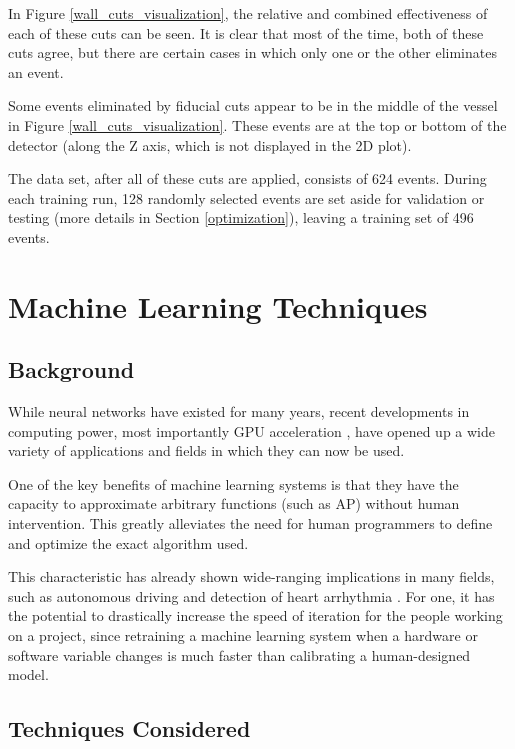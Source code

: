 \documentclass[10pt]{article}
\begin{document}
In Figure \ref{wall_cuts_visualization}, the relative and combined effectiveness of each of these cuts can be seen. It is clear that most of the time, both of these cuts agree, but there are certain cases in which only one or the other eliminates an event.

Some events eliminated by fiducial cuts appear to be in the middle of the vessel in Figure \ref{wall_cuts_visualization}. These events are at the top or bottom of the detector (along the Z axis, which is not displayed in the 2D plot).

The data set, after all of these cuts are applied, consists of 624 events. During each training run, 128 randomly selected events are set aside for validation or testing (more details in Section \ref{optimization}), leaving a training set of 496 events.

\section{Machine Learning Techniques} \label{ml_techniques}

\subsection{Background}

While neural networks have existed for many years, recent developments in computing power, most importantly GPU acceleration \cite{gpu}, have opened up a wide variety of applications and fields in which they can now be used.

One of the key benefits of machine learning systems is that they have the capacity to approximate arbitrary functions (such as AP) without human intervention. This greatly alleviates the need for human programmers to define and optimize the exact algorithm used.

This characteristic has already shown wide-ranging implications in many fields, such as autonomous driving \cite{end-to-end} and detection of heart arrhythmia \cite{arrhythmia}. For one, it has the potential to drastically increase the speed of iteration for the people working on a project, since retraining a machine learning system when a hardware or software variable changes is much faster than calibrating a human-designed model.

\subsection{Techniques Considered}
\end{document}
